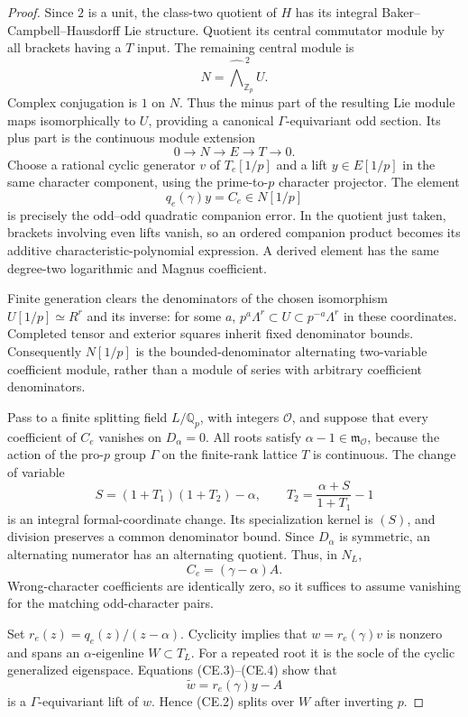 \documentclass[11pt,a4paper]{article}
\theoremstyle{definition}
\begin{document}
\begin{proof}
Since $2$ is a unit, the class-two quotient of $H$ has its integral
Baker--Campbell--Hausdorff Lie structure. Quotient its central
commutator module by all brackets having a $T$ input. The remaining
central module is
\[
 N=\widehat{\bigwedge}^{\,2}_{\mathbb Z_p}U.
\]
Complex conjugation is $1$ on $N$. Thus the minus part of the
resulting Lie module maps isomorphically to $U$, providing a
canonical $\Gamma$-equivariant odd section. Its plus part is the
continuous module extension
\[
 0\longrightarrow N\longrightarrow E\longrightarrow T
 \longrightarrow0.                                          \tag{CE.2}
\]
Choose a rational cyclic generator $v$ of $T_e[1/p]$ and a lift
$y\in E[1/p]$ in the same character component, using the
prime-to-$p$ character projector. The element
\[
 q_e(\gamma)y=C_e\in N[1/p]                                 \tag{CE.3}
\]
is precisely the odd--odd quadratic companion error. In the quotient
just taken, brackets involving even lifts vanish, so an ordered
companion product becomes its additive characteristic-polynomial
expression. A derived element has the same degree-two logarithmic
and Magnus coefficient.

Finite generation clears the denominators of the chosen isomorphism
$U[1/p]\simeq R^r$ and its inverse: for some $a$,
$p^a\Lambda^r\subset U\subset p^{-a}\Lambda^r$ in these
coordinates. Completed tensor and exterior squares inherit fixed
denominator bounds. Consequently $N[1/p]$ is the bounded-denominator
alternating two-variable coefficient module, rather than a module of
series with arbitrary coefficient denominators.

Pass to a finite splitting field $L/\mathbb Q_p$, with integers
$\mathcal O$, and suppose that every coefficient of $C_e$ vanishes
on $D_\alpha=0$. All roots satisfy $\alpha-1\in\mathfrak m_{\mathcal O}$,
because the action of the pro-$p$ group $\Gamma$ on the finite-rank
lattice $T$ is continuous. The change of variable
\[
 S=(1+T_1)(1+T_2)-\alpha,\qquad
 T_2=\frac{\alpha+S}{1+T_1}-1
\]
is an integral formal-coordinate change. Its specialization kernel
is $(S)$, and division preserves a common denominator bound.
Since $D_\alpha$ is symmetric, an alternating numerator has an
alternating quotient. Thus, in $N_L$,
\[
 C_e=(\gamma-\alpha)A.                                      \tag{CE.4}
\]
Wrong-character coefficients are identically zero, so it suffices
to assume vanishing for the matching odd-character pairs.

Set $r_e(z)=q_e(z)/(z-\alpha)$. Cyclicity implies that
$w=r_e(\gamma)v$ is nonzero and spans an $\alpha$-eigenline
$W\subset T_L$. For a repeated root it is the socle of the cyclic
generalized eigenspace. Equations (CE.3)--(CE.4) show that
\[
 \widetilde w=r_e(\gamma)y-A
\]
is a $\Gamma$-equivariant lift of $w$. Hence (CE.2) splits over
$W$ after inverting $p$.


\end{proof}
\end{document}
